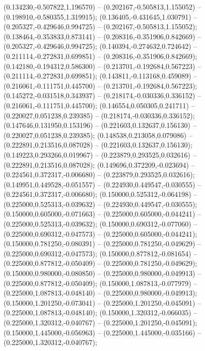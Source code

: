  (0.134230,-0.507822,1.196570) -- (0.202167,-0.505813,1.155052) -- (0.198910,-0.580355,1.319915);
 (0.136405,-0.431645,1.030791) -- (0.205327,-0.429646,0.994725) -- (0.202167,-0.505813,1.155052);
 (0.138464,-0.353833,0.873141) -- (0.208316,-0.351906,0.842669) -- (0.205327,-0.429646,0.994725);
 (0.140394,-0.274632,0.724642) -- (0.211114,-0.272831,0.699851) -- (0.208316,-0.351906,0.842669);
 (0.142180,-0.194312,0.586300) -- (0.213701,-0.192684,0.567223) -- (0.211114,-0.272831,0.699851);
 (0.143811,-0.113168,0.459089) -- (0.216061,-0.111751,0.445700) -- (0.213701,-0.192684,0.567223);
 (0.145272,-0.031518,0.343937) -- (0.218174,-0.030336,0.336152) -- (0.216061,-0.111751,0.445700);
 (0.146554,0.050305,0.241711) -- (0.220027,0.051238,0.239385) -- (0.218174,-0.030336,0.336152);
 (0.147646,0.131950,0.153196) -- (0.221603,0.132637,0.156130) -- (0.220027,0.051238,0.239385);
 (0.148538,0.213058,0.079086) -- (0.222891,0.213516,0.087028) -- (0.221603,0.132637,0.156130);
 (0.149223,0.293266,0.019967) -- (0.223879,0.293525,0.032616) -- (0.222891,0.213516,0.087028);
 (0.149696,0.372209,-0.023694) -- (0.224561,0.372317,-0.006680) -- (0.223879,0.293525,0.032616);
 (0.149951,0.449528,-0.051557) -- (0.224930,0.449547,-0.030555) -- (0.224561,0.372317,-0.006680);
 (0.150000,0.525312,-0.064198) -- (0.225000,0.525313,-0.039632) -- (0.224930,0.449547,-0.030555);
 (0.150000,0.605000,-0.071663) -- (0.225000,0.605000,-0.044241) -- (0.225000,0.525313,-0.039632);
 (0.150000,0.690312,-0.077060) -- (0.225000,0.690312,-0.047573) -- (0.225000,0.605000,-0.044241);
 (0.150000,0.781250,-0.080391) -- (0.225000,0.781250,-0.049629) -- (0.225000,0.690312,-0.047573);
 (0.150000,0.877812,-0.081654) -- (0.225000,0.877812,-0.050409) -- (0.225000,0.781250,-0.049629);
 (0.150000,0.980000,-0.080850) -- (0.225000,0.980000,-0.049913) -- (0.225000,0.877812,-0.050409);
 (0.150000,1.087813,-0.077979) -- (0.225000,1.087813,-0.048140) -- (0.225000,0.980000,-0.049913);
 (0.150000,1.201250,-0.073041) -- (0.225000,1.201250,-0.045091) -- (0.225000,1.087813,-0.048140);
 (0.150000,1.320312,-0.066035) -- (0.225000,1.320312,-0.040767) -- (0.225000,1.201250,-0.045091);
 (0.150000,1.445000,-0.056963) -- (0.225000,1.445000,-0.035166) -- (0.225000,1.320312,-0.040767);
